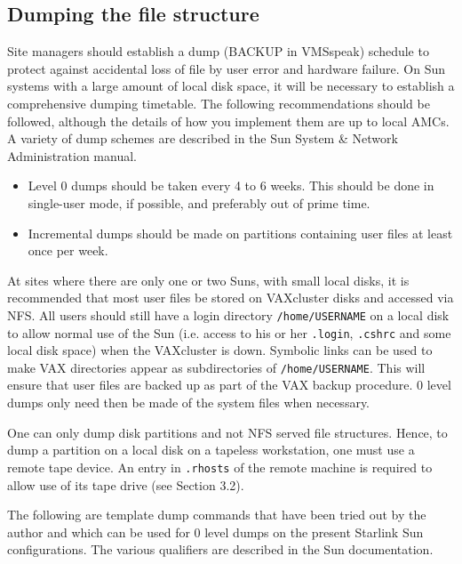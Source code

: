 \subsection{Dumping the file structure}

Site managers should establish a dump (BACKUP in VMSspeak) schedule 
to protect against accidental loss of file by user error and hardware failure. 
On Sun systems with a large amount of local disk space, it will be necessary 
to establish a comprehensive dumping timetable. The following recommendations
should be followed, although the details of how you implement them are 
up to local AMCs. A variety of dump schemes are described in the 
Sun System \& Network Administration manual. 

\begin{itemize}

\item Level 0 dumps should be taken every 4 to 6 weeks. This should be done
in single-user mode, if possible, and preferably out of prime time. 

\item Incremental dumps should be made on partitions containing user files 
at least once per week.

\end{itemize} 

At sites where there are only one or two Suns, with small local disks, it is
recommended that most user files be stored on VAXcluster disks and accessed via
NFS. All users should still have a login directory {\tt /home/USERNAME} on a 
local disk to allow normal use of the Sun (i.e. access to his or her
{\tt .login}, {\tt .cshrc}
and some local disk space) when the VAXcluster is down. Symbolic links 
can be used to make VAX directories appear as subdirectories of 
{\tt /home/USERNAME}.
This will ensure that user files are backed up as part of the VAX backup
procedure. 0 level dumps only need then be made of the system files when
necessary. 
  
One can only dump disk partitions and not NFS served file structures. Hence,
to dump a partition on a local disk on a tapeless workstation, one must use 
a remote tape device. An entry in {\tt .rhosts} of the remote machine is required
to allow use of its tape drive (see Section 3.2).

The following are template dump commands that have been tried out by the
author and which can be used for 0 level dumps on the present Starlink Sun
configurations. The various qualifiers are described  in the Sun documentation.

